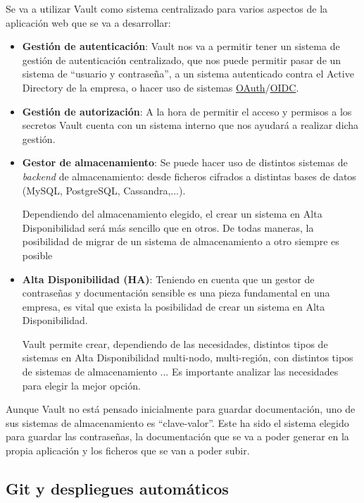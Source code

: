\documentclass{\ClassPath/viu-tfm-template}
\begin{document}
Se va a utilizar Vault como sistema centralizado para varios aspectos de la aplicación web que se va a desarrollar:

\begin{itemize}
    \item \textbf{Gestión de autenticación}: Vault nos va a permitir tener un sistema de gestión de autenticación centralizado, que nos puede permitir pasar de un sistema de “usuario y contraseña”, a un sistema autenticado contra el Active Directory de la empresa, o hacer uso de sistemas  \href{https://en.wikipedia.org/wiki/OAuth}{OAuth}/\href{https://en.wikipedia.org/wiki/OpenID#OpenID_Connect_(OIDC)}{OIDC}.

    \item \textbf{Gestión de autorización}: A la hora de permitir el acceso y permisos a los secretos Vault cuenta con un sistema interno que nos ayudará a realizar dicha gestión.

    \item \textbf{Gestor de almacenamiento}: Se puede hacer uso de distintos sistemas de \textit{backend} de almacenamiento: desde ficheros cifrados a distintas bases de datos (MySQL, PostgreSQL, Cassandra,...).

    Dependiendo del almacenamiento elegido, el crear un sistema en Alta Disponibilidad será más sencillo que en otros. De todas maneras, la posibilidad de migrar de un sistema de almacenamiento a otro siempre es posible

    \item \textbf{Alta Disponibilidad (HA)}: Teniendo en cuenta que un gestor de contraseñas y documentación sensible es una pieza fundamental en una empresa, es vital que exista la posibilidad de crear un sistema en Alta Disponibilidad.

    Vault permite crear, dependiendo de las necesidades, distintos tipos de sistemas en Alta Disponibilidad multi-nodo, multi-región, con distintos tipos de sistemas de almacenamiento ... Es importante analizar las necesidades para elegir la mejor opción.

\end{itemize}

Aunque Vault no está pensado inicialmente para guardar documentación, uno de sus sistemas de almacenamiento es “clave-valor”.  Este ha sido el sistema elegido para guardar las contraseñas, la documentación que se va a poder generar en la propia aplicación y los ficheros que se van a poder subir.


\subsection{Git y despliegues automáticos}
\end{document}
